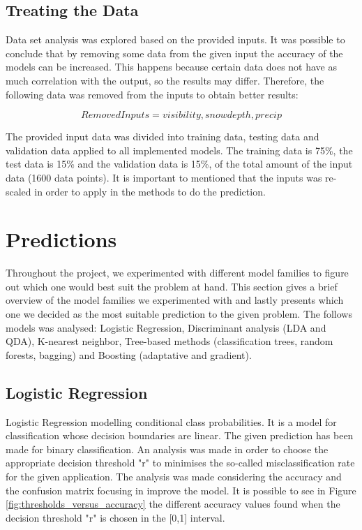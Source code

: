 \documentclass{article}
\begin{document}
\subsection{Treating the Data}

Data set analysis was explored based on the provided inputs. It was possible to conclude that by removing some data from the given input the accuracy of the models can be increased. This happens because certain data does not have as much correlation with the output, so the results may differ. Therefore, the following data was removed from the inputs to obtain better results:

\begin{equation}
RemovedInputs = visibility, snowdepth, precip
\end{equation}

The provided input data was divided into training data, testing data and validation data applied to all implemented models. The training data is 75\%, the test data is 15\% and the validation data is 15\%, of the total amount of the input data (1600 data points). It is important to mentioned that the inputs was re-scaled in order to apply in the methods to do the prediction.


\section{Predictions}
Throughout the project, we experimented with different model families to figure out which one would best suit the problem at hand. This section gives a brief overview of the model families we experimented with and lastly presents which one we decided as the most suitable prediction to the given problem. The follows models was analysed: Logistic Regression, Discriminant analysis (LDA and QDA), K-nearest neighbor, Tree-based methods (classification trees, random forests, bagging) and Boosting (adaptative and gradient).


\subsection{Logistic Regression}

Logistic Regression  modelling conditional class probabilities. It is a model for classification whose decision boundaries are linear. The given prediction has been made for binary classification. An analysis was made in order to choose the appropriate decision threshold "r" to minimises the so-called misclassification rate for the given application. The analysis was made considering the accuracy and the confusion matrix focusing in improve the model. It is possible to see in Figure \ref{fig:thresholds_versus_accuracy} the different accuracy values found when the decision threshold "r" is chosen in the [0,1] interval.
\end{document}
